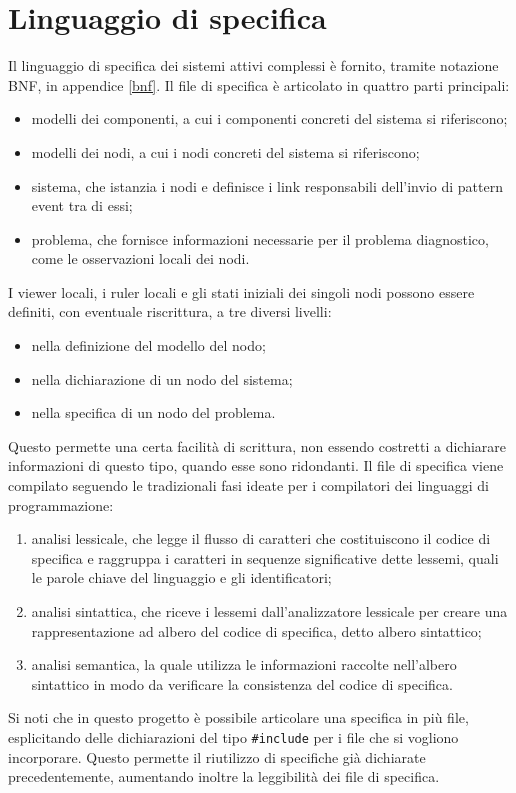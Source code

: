 \newpage
\section{Linguaggio di specifica}
Il linguaggio di specifica dei sistemi attivi complessi è fornito, tramite notazione BNF, in appendice \ref{bnf}. 
Il file di specifica è articolato in quattro parti principali:
\begin{itemize}
\item modelli dei componenti, a cui i componenti concreti del sistema si riferiscono;
\item modelli dei nodi, a cui i nodi concreti del sistema si riferiscono;
\item sistema, che istanzia i nodi e definisce i link responsabili dell'invio di pattern event tra di essi;
\item problema, che fornisce informazioni necessarie per il problema diagnostico, come le osservazioni locali dei nodi.
\end{itemize}
I viewer locali, i ruler locali e gli stati iniziali dei singoli nodi possono essere definiti, con eventuale riscrittura, a tre diversi livelli:
\begin{itemize}
\item nella definizione del modello del nodo;
\item nella dichiarazione di un nodo del sistema;
\item nella specifica di un nodo del problema.
\end{itemize}
Questo permette una certa facilità di scrittura, non essendo costretti a dichiarare informazioni di questo tipo, quando esse sono ridondanti.
Il file di specifica viene compilato seguendo le tradizionali fasi ideate per i compilatori dei linguaggi di programmazione:
\begin{enumerate}
\item analisi lessicale, che legge il flusso di caratteri che costituiscono il codice di specifica e raggruppa i caratteri in sequenze significative dette lessemi, quali le parole chiave del linguaggio e gli identificatori;
\item analisi sintattica, che riceve i lessemi dall'analizzatore lessicale per creare una rappresentazione ad albero del codice di specifica, detto albero sintattico;
\item analisi semantica, la quale utilizza le informazioni raccolte nell'albero sintattico in modo da verificare la consistenza del codice di specifica.
\end{enumerate}
Si noti che in questo progetto è possibile articolare una specifica in più file, esplicitando delle dichiarazioni del tipo \verb|#include| per i file che si vogliono incorporare. 
Questo permette il riutilizzo di specifiche già dichiarate precedentemente, aumentando inoltre la leggibilità dei file di specifica.


